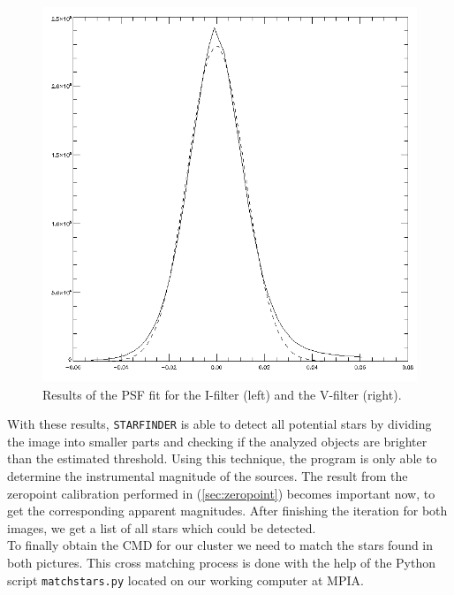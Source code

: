 \begin{figure}[H]
\begin{minipage}{0.2\textwidth}
\vspace{3pt}
\hspace{15pt}
		\includegraphics[scale=0.14]{figures/Exposures/psf_noise_V.png}
\end{minipage}
\caption[Results of the PSF fit]{Results of the PSF fit for the I-filter (left) and the V-filter (right).} 
\end{figure} 

With these results, \texttt{STARFINDER} is able to detect all potential stars by dividing the image into smaller parts and checking if the analyzed objects are brighter than the estimated threshold. 
Using this technique, the program is only able to determine the instrumental magnitude of the sources. The result from the zeropoint calibration performed in (\ref{sec:zeropoint}) becomes important now, to get the corresponding apparent magnitudes.
After finishing the iteration for both images, we get a list of all stars which could be detected. \\
To finally obtain the CMD for our cluster we need to match the stars found in both pictures. This cross matching process is done with the help of the Python script \texttt{matchstars.py} located on our working computer at MPIA. \\ 

